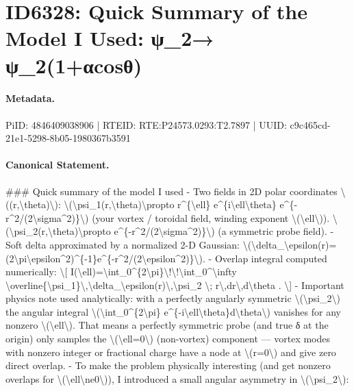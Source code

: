 \section*{ID6328: Quick Summary of the Model I Used: ψ\_2→ ψ\_2(1+αcosθ)}
\paragraph{Metadata.}
PiID: 4846409038906 | RTEID: RTE:P24573.0293:T2.7897 | UUID: c9c465cd-21e1-5298-8b05-1980367b3591

\paragraph{Canonical Statement.}
\#\#\# Quick summary of the model I used - Two fields in 2D polar coordinates \textbackslash{}((r,\textbackslash{}theta)\textbackslash{}): \textbackslash{}(\textbackslash{}psi\_1(r,\textbackslash{}theta)\textbackslash{}propto r\textasciicircum{}\{\textbackslash{}ell\} e\textasciicircum{}\{i\textbackslash{}ell\textbackslash{}theta\} e\textasciicircum{}\{-r\textasciicircum{}2/(2\textbackslash{}sigma\textasciicircum{}2)\}\textbackslash{}) (your vortex / toroidal field, winding exponent \textbackslash{}(\textbackslash{}ell\textbackslash{})). \textbackslash{}(\textbackslash{}psi\_2(r,\textbackslash{}theta)\textbackslash{}propto e\textasciicircum{}\{-r\textasciicircum{}2/(2\textbackslash{}sigma\textasciicircum{}2)\}\textbackslash{}) (a symmetric probe field). - Soft delta approximated by a normalized 2-D Gaussian: \textbackslash{}(\textbackslash{}delta\_\textbackslash{}epsilon(r)=(2\textbackslash{}pi\textbackslash{}epsilon\textasciicircum{}2)\textasciicircum{}\{-1\}e\textasciicircum{}\{-r\textasciicircum{}2/(2\textbackslash{}epsilon\textasciicircum{}2)\}\textbackslash{}). - Overlap integral computed numerically: \textbackslash{}[ I(\textbackslash{}ell)=\textbackslash{}int\_0\textasciicircum{}\{2\textbackslash{}pi\}\textbackslash{}!\textbackslash{}!\textbackslash{}int\_0\textasciicircum{}\textbackslash{}infty \textbackslash{}overline\{\textbackslash{}psi\_1\}\textbackslash{},\textbackslash{}delta\_\textbackslash{}epsilon(r)\textbackslash{},\textbackslash{}psi\_2 \textbackslash{}; r\textbackslash{},dr\textbackslash{},d\textbackslash{}theta . \textbackslash{}] - Important physics note used analytically: with a perfectly angularly symmetric \textbackslash{}(\textbackslash{}psi\_2\textbackslash{}) the angular integral \textbackslash{}(\textbackslash{}int\_0\textasciicircum{}\{2\textbackslash{}pi\} e\textasciicircum{}\{-i\textbackslash{}ell\textbackslash{}theta\}d\textbackslash{}theta\textbackslash{}) vanishes for any nonzero \textbackslash{}(\textbackslash{}ell\textbackslash{}). That means a perfectly symmetric probe (and true δ at the origin) only samples the \textbackslash{}(\textbackslash{}ell=0\textbackslash{}) (non-vortex) component — vortex modes with nonzero integer or fractional charge have a node at \textbackslash{}(r=0\textbackslash{}) and give zero direct overlap. - To make the problem physically interesting (and get nonzero overlaps for \textbackslash{}(\textbackslash{}ell\textbackslash{}ne0\textbackslash{})), I introduced a small angular asymmetry in \textbackslash{}(\textbackslash{}psi\_2\textbackslash{}): 